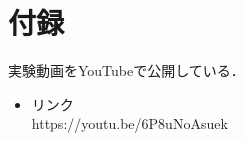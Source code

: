 \chapter*{付録}

  実験動画をYouTubeで公開している．

\vspace{0.5cm}

  \begin{itemize}
    \item リンク\\
          https://youtu.be/6P8uNoAsuek
  \end{itemize}
 
